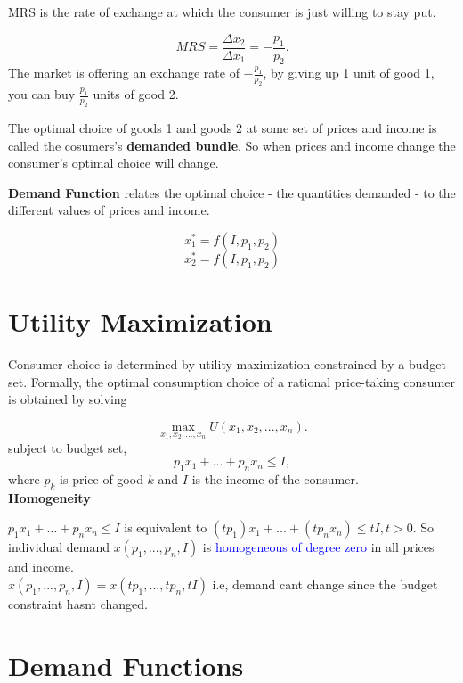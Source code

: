 \documentclass{tufte-handout}
\begin{document}
MRS is the rate of exchange at which the consumer is just willing to stay put.

 \[
MRS = \frac{\Delta x_2}{\Delta x_1} =  -\frac{p_1}{p_2}
.\] 
The market is offering an exchange rate of $-\frac{p_1}{p_2}$, by giving up 1 unit of good 1, you can buy $\frac{p_1}{p_2}$ units of good 2.

The optimal choice of goods 1 and goods 2 at some set of prices and income is called the cosumers's \textbf{demanded bundle}. So when prices and income change the consumer's optimal choice will change.



\textbf{Demand Function} relates the optimal choice - the quantities demanded - to the different values of prices and income.

\[
x_1^* = f(I, p_1, p_2)\] $$  x_2^* = f(I, p_1, p_2)$$


\section*{\textbf{Utility Maximization}}


Consumer choice is determined by utility maximization constrained by a budget set. Formally, the optimal consumption choice of a rational price-taking consumer is obtained by solving


\[
		\max_{x_1, x_2, ..., x_n} U(x_1, x_2,...,x_n)
.\] 
subject to budget set,
\[
p_1x_1 + ... + p_nx_n \le I
,\] 
where $p_k$ is price of good $k$ and  $I$ is the income of the consumer. \\ 


\textbf{Homogeneity}

$p_1x_1 + ... + p_nx_n \le I$ is equivalent to $(tp_1)x_1 + ... +(tp_nx_n) \le tI, t>0$. So individual demand $x(p_1,..., p_n, I)$ is \textcolor{blue}{homogeneous of degree zero} in all prices and income.\\
$x(p_1, ...,p_n, I) = x(tp_1, ..., tp_n, tI)$ i.e, demand cant change since the budget constraint hasnt changed.





\section*{\textbf{Demand Functions}}
\end{document}
